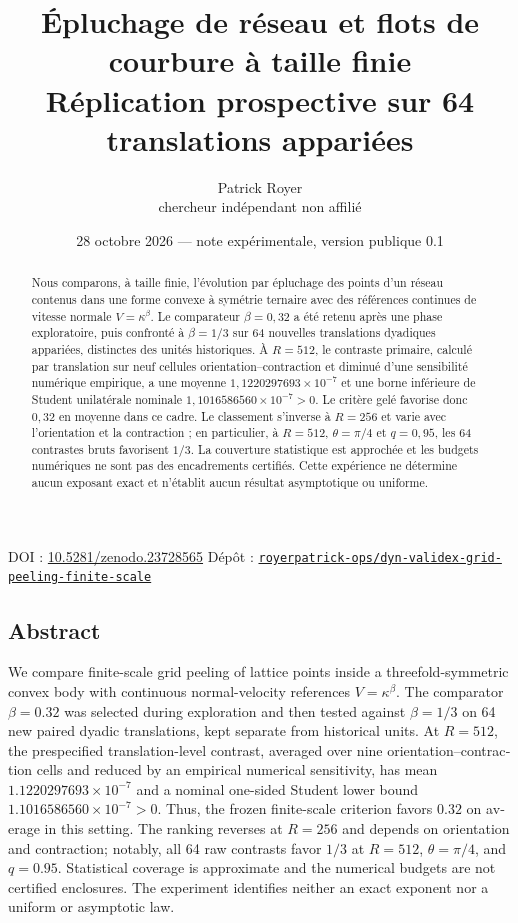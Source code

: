 \documentclass[11pt,a4paper]{article}
\title{\textbf{Épluchage de réseau et flots de courbure à taille finie}\vspace{0.25em}\\
\large Réplication prospective sur 64 translations appariées}
\author{Patrick Royer\\\small chercheur indépendant non affilié}
\date{28 octobre 2026 --- note expérimentale, version publique 0.1}
\newcommand{\versiondoi}{10.5281/zenodo.23728565}
\newcommand{\repo}{https://github.com/royerpatrick-ops/dyn-validex-grid-peeling-finite-scale}
\begin{document}
\maketitle

\begin{center}
\small
DOI : \href{https://doi.org/\versiondoi}{\versiondoi} \quad\textbullet\quad
Dépôt : \href{\repo}{\nolinkurl{royerpatrick-ops/dyn-validex-grid-peeling-finite-scale}}
\end{center}

\begin{abstract}
Nous comparons, à taille finie, l'évolution par épluchage des points d'un réseau contenus dans une forme convexe à symétrie ternaire avec des références continues de vitesse normale $V=\kappa^\beta$. Le comparateur $\beta=0{,}32$ a été retenu après une phase exploratoire, puis confronté à $\beta=1/3$ sur 64 nouvelles translations dyadiques appariées, distinctes des unités historiques. À $R=512$, le contraste primaire, calculé par translation sur neuf cellules orientation--contraction et diminué d'une sensibilité numérique empirique, a une moyenne $1{,}1220297693\times10^{-7}$ et une borne inférieure de Student unilatérale nominale $1{,}1016586560\times10^{-7}>0$. Le critère gelé favorise donc $0{,}32$ en moyenne dans ce cadre. Le classement s'inverse à $R=256$ et varie avec l'orientation et la contraction ; en particulier, à $R=512$, $\theta=\pi/4$ et $q=0{,}95$, les 64 contrastes bruts favorisent $1/3$. La couverture statistique est approchée et les budgets numériques ne sont pas des encadrements certifiés. Cette expérience ne détermine aucun exposant exact et n'établit aucun résultat asymptotique ou uniforme.
\end{abstract}

\begin{otherlanguage}{english}
\section*{Abstract}
We compare finite-scale grid peeling of lattice points inside a threefold-symmetric convex body with continuous normal-velocity references $V=\kappa^\beta$. The comparator $\beta=0.32$ was selected during exploration and then tested against $\beta=1/3$ on 64 new paired dyadic translations, kept separate from historical units. At $R=512$, the prespecified translation-level contrast, averaged over nine orientation--contraction cells and reduced by an empirical numerical sensitivity, has mean $1.1220297693\times10^{-7}$ and a nominal one-sided Student lower bound $1.1016586560\times10^{-7}>0$. Thus, the frozen finite-scale criterion favors $0.32$ on average in this setting. The ranking reverses at $R=256$ and depends on orientation and contraction; notably, all 64 raw contrasts favor $1/3$ at $R=512$, $\theta=\pi/4$, and $q=0.95$. Statistical coverage is approximate and the numerical budgets are not certified enclosures. The experiment identifies neither an exact exponent nor a uniform or asymptotic law.
\end{otherlanguage}
\end{document}
